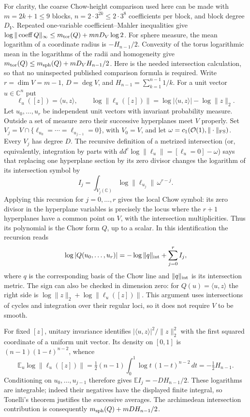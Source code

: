 For clarity, the coarse Chow-height comparison used here can be made
with $m=2k+1\le9$ blocks, $n=2\cdot3^{2k}\le2\cdot3^8$ coefficients per block, and block
degree $D_V$.  Repeated one-variable coefficient--Mahler inequalities
give $\log\|\operatorname{coeff}Q\|_\infty
\le m_{\rm tor}(Q)+mnD_V\log2$.
For sphere measure, the mean logarithm of a coordinate radius is
$-H_{n-1}/2$.  Convexity of the torus logarithmic mean in the logarithms
of the radii and homogeneity give
$m_{\rm tor}(Q)\le m_{\rm sph}(Q)+mD_VH_{n-1}/2$.
Here is the needed intersection calculation, so that no uninspected
published comparison formula is required.  Write $r=\dim V=m-1$,
$D=\deg V$, and $H_{n-1}=\sum_{k=1}^{n-1}1/k$.  For a unit vector
$u\in\mathbb C^n$ put
\[
 \ell_u([z])=\langle u,z\rangle,\qquad
 \log\|\ell_u([z])\|=\log|\langle u,z\rangle|-\log\|z\|_2.
\]
Let $u_0,\ldots,u_r$ be independent unit vectors with invariant
probability measure.  Outside a set of measure zero their successive
hyperplanes meet $V$ properly.  Set
$V_j=V\cap\{\ell_{u_0}=\cdots=\ell_{u_{j-1}}=0\}$, with
$V_0=V$, and let $\omega=c_1(\mathcal O(1),\|\cdot\|_{\rm FS})$.
Every $V_j$ has degree $D$.  The recursive definition of a metrized
intersection (or, equivalently, integration by parts with
$dd^c\log\|\ell_u\|=[\ell_u=0]-\omega$) says that replacing
one hyperplane section by its zero divisor changes the logarithm
of its intersection symbol by
\[
 I_j=\int_{V_j(\mathbb C)}\log\|\ell_{u_j}\|\,\omega^{r-j}.
\]
Applying this recursion for $j=0,\ldots,r$ gives the local Chow
symbol: its zero divisor in the hyperplane variables is precisely
the locus where the $r+1$ hyperplanes have a common point on $V$,
with the intersection multiplicities.  Thus its polynomial is the
Chow form $Q$, up to a scalar.  In this identification the recursion
reads
\[
 \log|Q(u_0,\ldots,u_r)|
       =-\log\|q\|_{\rm int}+\sum_{j=0}^r I_j,
\]
where $q$ is the corresponding basis of the Chow line and
$\|q\|_{\rm int}$ is its intersection metric.  The sign can also be
checked in dimension zero: for $Q(u)=\langle u,z\rangle$ the right
side is $\log\|z\|_2+\log\|\ell_u([z])\|$.
This argument uses intersections of cycles and integration over their
regular loci, so it does not require $V$ to be smooth.

For fixed $[z]$, unitary invariance identifies
$|\langle u,z\rangle|^2/\|z\|_2^2$ with the first squared coordinate
of a uniform unit vector.  Its density on $[0,1]$ is
$(n-1)(1-t)^{n-2}$, whence
\[
 \mathbb E_u\log\|\ell_u([z])\|
 =\tfrac12(n-1)\int_0^1\log t\,(1-t)^{n-2}\,dt
 =-\tfrac12 H_{n-1}.
\]
Conditioning on $u_0,\ldots,u_{j-1}$ therefore gives
$\mathbb E I_j=-DH_{n-1}/2$.  These logarithms are integrable;
indeed their negatives have the displayed finite integral, so
Tonelli's theorem justifies the successive averages.  The archimedean
intersection contribution is consequently
$m_{\rm sph}(Q)+mDH_{n-1}/2$.

